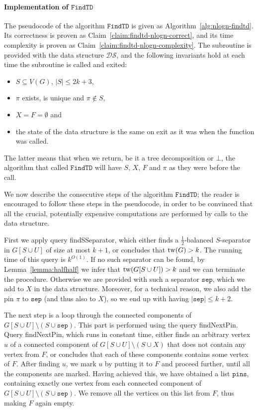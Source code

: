 \documentclass[a4paper,11pt]{article}
\theoremstyle{definition}
\theoremstyle{remark}
\newcommand{\findTD}{\mathtt{FindTD}}
\newcommand{\ds}{\mathcal{DS}}
\newcommand{\sep}{\mathtt{sep}}
\newcommand{\pins}{\mathtt{pins}}
\newcommand{\qSsep}{\textnormal{findSSeparator}}
\newcommand{\qpin}{\textnormal{findNextPin}}
\newcommand{\false}{\bot}
\newcommand{\pin}{\pi}
\begin{document}
\paragraph{Implementation of $\findTD$}
The pseudocode of the algorithm $\findTD$ is given as
Algorithm~\ref{alg:nlogn-findtd}.  Its correctness is proven as
Claim~\ref{claim:findtd-nlogn-correct}, and its time complexity is
proven as Claim~\ref{claim:findtd-nlogn-complexity}.  The subroutine
is provided with the data structure $\ds$, and the following
invariants hold at each time the subroutine is called and exited:
\begin{itemize}
\item $S \subseteq V(G)$, $|S| \leq 2k+3$,
\item $\pin$ exists, is unique and $\pin \notin S$,
\item $X = F = \emptyset$ and
\item the state of the data structure is the same on exit as it was
  when the function was called.
\end{itemize}
The latter means that when we return, be it a tree decomposition or
$\false$, the algorithm that called $\findTD$ will have $S$, $X$, $F$
and $\pin$ as they were before the call.

We now describe the consecutive steps of the algorithm $\findTD$; the
reader is encouraged to follow these steps in the pseudocode, in order
to be convinced that all the crucial, potentially expensive
computations are performed by calls to the data structure.

First we apply query \qSsep, which either finds a
$\frac{1}{2}$-balanced $S$-separator in $G[S\cup U]$ of size at most
$k+1$, or concludes that $\mathrm{tw}(G) > k$.  The running time of this query
is $k^{O(1)}$.  If no such separator can be found, by
Lemma~\ref{lemma:halfhalf} we infer that $\mathrm{tw}(G[S\cup U])>k$ and we
can terminate the procedure.  Otherwise we are provided with such a
separator $\sep$, which we add to $X$ in the data structure.
Moreover, for a technical reason, we also add the pin $\pin$ to $\sep$
(and thus also to $X$), so we end up with having $|\sep| \leq k + 2$.

The next step is a loop through the connected components of $G[S\cup
U]\setminus (S\cup \sep)$.  This part is performed using the query
\qpin.  Query \qpin, which runs in constant time, either finds an
arbitrary vertex $u$ of a connected component of $G[S\cup U]\setminus
(S\cup X)$ that does not contain any vertex from $F$, or concludes
that each of these components contains some vertex of $F$.  After
finding $u$, we mark $u$ by putting it to $F$ and proceed further,
until all the components are marked.  Having achieved this, we have
obtained a list $\pins$, containing exactly one vertex from each
connected component of $G[S\cup U]\setminus (S\cup \sep)$.  We remove
all the vertices on this list from $F$, thus making $F$ again empty.
\end{document}
